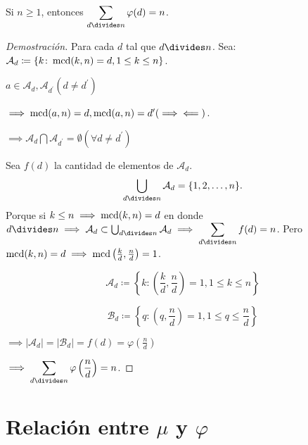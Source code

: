 \begin{theorem}
	Si $n\geq1$, entonces $\displaystyle\sum_{d\divides n}\varphi(d)=n$.
\begin{proof}[Demostración]
	Para cada $d$ tal que $d\divides n$.
	Sea: $\mathcal{A}_d\coloneq\{k\colon\operatorname{mcd}(k,n)=d, 1\leq k\leq n\}$.
	
	$a\in\mathcal{A}_d, \mathcal{A}_{d^{\prime}} (d\neq d^{\prime})$
	
	$\implies \operatorname{mcd}(a,n)=d, \operatorname{mcd}(a,n)=d^{\prime} (\implies\impliedby)$.
	
	$\implies \mathcal{A}_{d}\bigcap\mathcal{A}_{d^{\prime}}=\emptyset (\forall d\neq d^{\prime})$
	
	Sea $f(d)$ la cantidad de elementos de $\mathcal{A}_{d}$.
	\[\bigcup_{d\divides n}\mathcal{A}_{d}=\{1,2,\ldots,n\}.%
	\]
	Porque si $k\leq n\implies \operatorname{mcd}(k,n)=d$ en donde $d\divides n\implies \mathcal{A}_{d}\subset\bigcup_{d\divides n}\mathcal{A}_{d}\implies\displaystyle\sum_{d\divides n}f(d)=n$.
	Pero $\operatorname{mcd}(k,n)=d\implies\operatorname{mcd}\left(\frac{k}{d},\frac{n}{d}\right)=1$.
	
	\[\mathcal{A}_{d}\coloneq\left\{k\colon\left(\frac{k}{d},\frac{n}{d}\right)=1, 1\leq k\leq n\right\}\]
	
	\[\mathcal{B}_{d}\coloneq\left\{q\colon\left(q,\frac{n}{d}\right)=1, 1\leq q\leq \frac{n}{d}\right\}\]
	
	$\implies|\mathcal{A}_{d}|=|\mathcal{B}_{d}|=f(d)=\varphi\left(\frac{n}{d}\right)$
	
	$\displaystyle\implies\sum_{d\divides n}\varphi\left(\frac{n}{d}\right)=n$.
\end{proof}
\end{theorem}

\section{Relación entre $\mu$ y $\varphi$}

